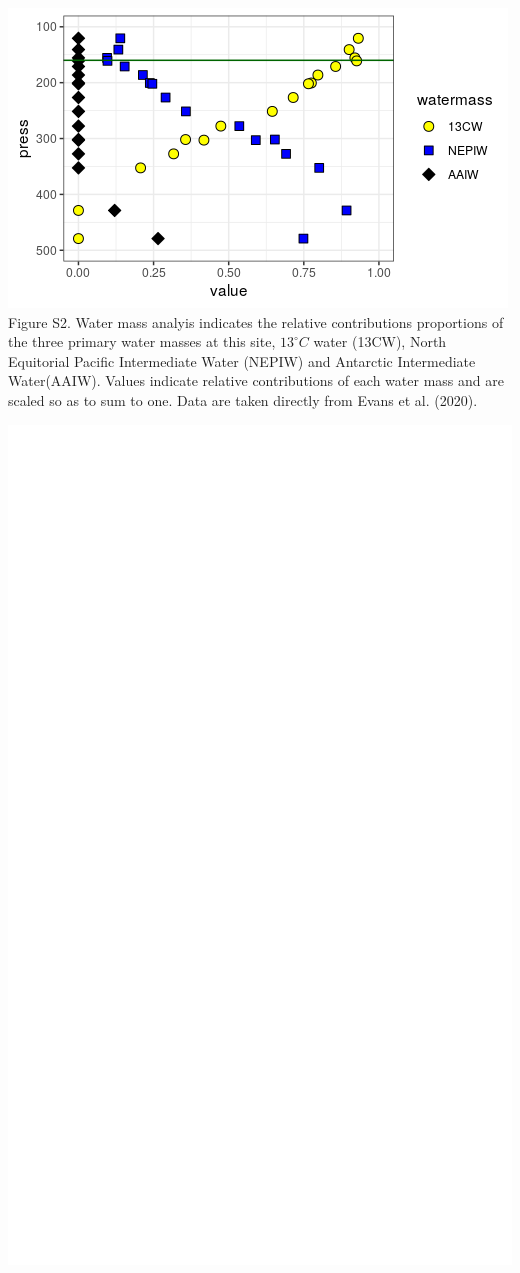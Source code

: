 \documentclass[]{article}
\begin{document}
\includegraphics{../figures/evans16p5N107W.png} Figure S2. Water mass
analyis indicates the relative contributions proportions of the three
primary water masses at this site, \(13^\circ C\) water (13CW), North
Equitorial Pacific Intermediate Water (NEPIW) and Antarctic Intermediate
Water(AAIW). Values indicate relative contributions of each water mass
and are scaled so as to sum to one. Data are taken directly from Evans
et al. (2020).

\includegraphics{../figures/stationP2_EK60_go7.png}
\end{document}

